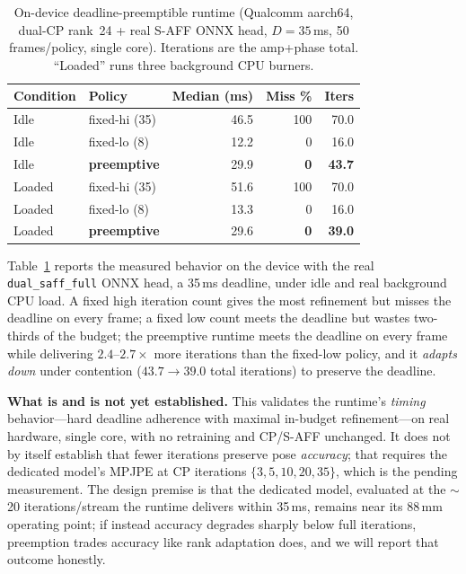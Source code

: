 \documentclass[10pt,conference]{IEEEtran}
\begin{document}
\begin{table}[t]
\centering
\caption{On-device deadline-preemptible runtime (Qualcomm aarch64, dual-CP rank~24 + real S-AFF ONNX head, $D=35$\,ms, 50 frames/policy, single core). Iterations are the amp+phase total. ``Loaded'' runs three background CPU burners.}
\label{tab:preempt}
\begin{tabular}{llrrr}
\toprule
Condition & Policy & Median (ms) & Miss \% & Iters \\
\midrule
Idle   & fixed-hi (35) & 46.5 & 100 & 70.0 \\
Idle   & fixed-lo (8)  & 12.2 & 0   & 16.0 \\
Idle   & \textbf{preemptive} & 29.9 & \textbf{0} & \textbf{43.7} \\
Loaded & fixed-hi (35) & 51.6 & 100 & 70.0 \\
Loaded & fixed-lo (8)  & 13.3 & 0   & 16.0 \\
Loaded & \textbf{preemptive} & 29.6 & \textbf{0} & \textbf{39.0} \\
\bottomrule
\end{tabular}
\end{table}

Table~\ref{tab:preempt} reports the measured behavior on the device with the real \texttt{dual\_saff\_full} ONNX head, a 35\,ms deadline, under idle and real background CPU load. A fixed high iteration count gives the most refinement but misses the deadline on every frame; a fixed low count meets the deadline but wastes two-thirds of the budget; the preemptive runtime meets the deadline on every frame while delivering $2.4$--$2.7\times$ more iterations than the fixed-low policy, and it \emph{adapts down} under contention ($43.7\to39.0$ total iterations) to preserve the deadline.

\textbf{What is and is not yet established.} This validates the runtime's \emph{timing} behavior---hard deadline adherence with maximal in-budget refinement---on real hardware, single core, with no retraining and CP/S-AFF unchanged. It does not by itself establish that fewer iterations preserve pose \emph{accuracy}; that requires the dedicated model's MPJPE at CP iterations $\{3,5,10,20,35\}$, which is the pending measurement. The design premise is that the dedicated model, evaluated at the $\sim$20 iterations/stream the runtime delivers within 35\,ms, remains near its 88\,mm operating point; if instead accuracy degrades sharply below full iterations, preemption trades accuracy like rank adaptation does, and we will report that outcome honestly.
\end{document}
